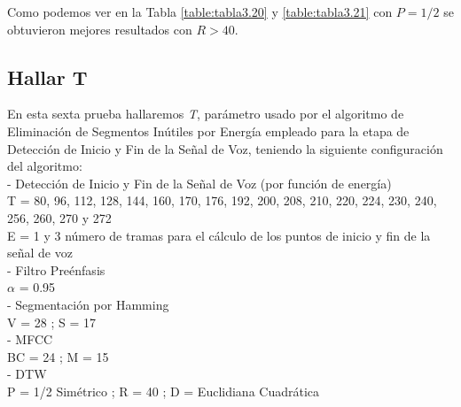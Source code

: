 Como podemos ver en la Tabla \ref{table:tabla3.20} y \ref{table:tabla3.21} con $P = 1/2$ se obtuvieron mejores resultados con $R > 40$.

\subsection{Hallar T}
En esta sexta prueba hallaremos \textit{T}, parámetro usado por el algoritmo de Eliminación de Segmentos Inútiles por Energía empleado para la etapa de Detección de Inicio y Fin de la Señal de Voz, teniendo la siguiente configuración del algoritmo: \\
- Detección de Inicio y Fin de la Señal de Voz (por función de energía) \\
\hspace*{1cm} T = 80, 96, 112, 128, 144, 160, 170, 176, 192, 200, 208, 210, 220, 224, 230, 240, 256, 260, 270 y 272 \\
\hspace*{1cm} E = 1 y 3 número de tramas para el cálculo de los puntos de inicio y fin de la señal de voz \\
- Filtro Preénfasis \\
\hspace*{1cm} $\alpha$ = 0.95 \\
- Segmentación por Hamming \\
\hspace*{1cm} V = 28 ; \qquad S = 17 \\
- MFCC \\
\hspace*{1cm} BC = 24 ; \qquad M = 15 \\
- DTW \\
\hspace*{1cm} P = 1/2 Simétrico ; \qquad R = 40 ; \qquad D = Euclidiana Cuadrática 

